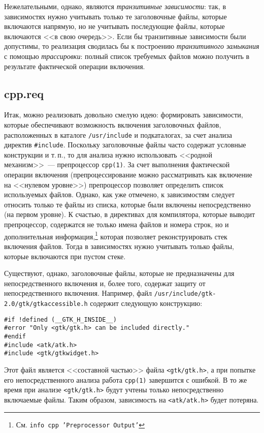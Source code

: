 \documentclass[russian,a4paper,12pt,titlepage]{article}
\begin{document}
Нежелательными, однако, являются \emph{транзитивные зависимости}: так, в зависимостях нужно учитывать
только те заголовочные файлы, которые включаются напрямую, но не учитывать последующие файлы, которые
включаются <<в свою очередь>>.  Если бы транзитивные зависимости были допустимы, то реализация сводилась бы
к построению \emph{транзитивного замыкания} с помощью \emph{трассировки}: полный список требуемых
файлов можно получить в результате фактической операции включения.

\subsection{cpp.req}
Итак, можно реализовать довольно смелую идею: формировать зависимости, которые обеспечивают возможность включения
заголовочных файлов, расположенных в каталоге \verb|/usr/include| и подкаталогах, за счет анализа директив \verb|#include|.
Поскольку заголовочные файлы часто содержат условные конструкции и т.\,п., то для анализа нужно использовать
<<родной механизм>>~--- препроцессор \verb|cpp(1)|.  За счет выполнения фактической операции включения (препроцессирование
можно рассматривать как включение на <<нулевом уровне>>) препроцессор позволяет определить список используемых файлов.
Однако, как уже отмечено, к зависимостям следует относить только те файлы из списка, которые были включены непосредственно
(на первом уровне).  К счастью, в директивах для компилятора, которые выводит препроцессор, содержатся не только имена файлов
и номера строк, но и дополнительная информация,\footnote{См. \texttt{info cpp 'Preprocessor Output'}}
которая позволяет реконструировать стек включения файлов.  Тогда в зависимостях нужно учитывать только файлы,
которые включаются при пустом стеке.

Существуют, однако, заголовочные файлы, которые не предназначены для непосредственного включения и, более того, содержат защиту
от непосредственного включения.  Например, файл \texttt{/usr/include/gtk-2.0/gtk/gtkaccessible.h} содержит следующую
конструкцию:
\begin{verbatim}
#if !defined (__GTK_H_INSIDE__)
#error "Only <gtk/gtk.h> can be included directly."
#endif
#include <atk/atk.h>
#include <gtk/gtkwidget.h>
\end{verbatim}
Этот файл является <<составной частью>> файла \verb|<gtk/gtk.h>|, а при попытке его непосредственного анализа
работа \verb|cpp(1)| завершится с ошибкой.  В то же время при анализе \verb|<gtk/gtk.h>| будут учтены только
непосредственно включаемые файлы.  Таким образом, зависимость на \verb|<atk/atk.h>| будет потеряна.
\end{document}
